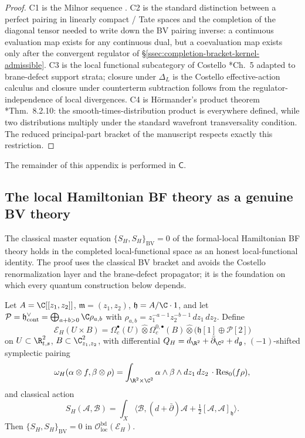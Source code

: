 \begin{proof}
C1 is the Milnor sequence
\cite{milnor-axiomatic-homology}.  C2 is the standard distinction
between a perfect pairing in linearly compact / Tate spaces and the
completion of the diagonal tensor needed to write down the BV pairing
inverse: a continuous evaluation map exists for any continuous dual,
but a coevaluation map exists only after the convergent regulator of
\S\ref{ssec:completion-bracket-kernel-admissible}.  C3 is the local
functional subcategory of Costello \cite{costello-renormalization}*{Ch.~5}
adapted to brane-defect support strata; closure under \(\Delta_L\) is
the Costello effective-action calculus and closure under counterterm
subtraction follows from the regulator-independence of local
divergences.  C4 is H\"ormander's product theorem
\cite{hormander-vol1}*{Thm.~8.2.10}: the smooth-times-distribution
product is everywhere defined, while two distributions multiply under the
standard wavefront transversality condition.  The reduced
principal-part bracket of the manuscript respects exactly this
restriction.
\end{proof}

The remainder of this appendix is performed in \(\mathsf C\).

\subsection{The local Hamiltonian BF theory as a genuine BV theory}
\label{ssec:completion-bv-theorem}

The classical master equation \(\{S_H,S_H\}_{\mathrm{BV}}=0\) of the
formal-local Hamiltonian BF theory holds in the completed
local-functional space as an honest local-functional identity.  The proof
uses the classical BV bracket and avoids the Costello renormalization layer and the
brane-defect propagator; it is the foundation on which every quantum
construction below depends.

\begin{thm}
\label{thm:completion-cme}
Let \(A=\C[[z_1,z_2]]\), \(\mathfrak m=(z_1,z_2)\),
\(\mathfrak h=A/\C\cdot 1\), and let
\(\mathcal P=\mathfrak h^\vee_{\mathrm{cont}}=
\bigoplus_{a+b>0}\C\rho_{a,b}\) with
\(\rho_{a,b}=z_1^{-a-1}z_2^{-b-1}\,dz_1\,dz_2\).  Define
\[
  \mathcal E_H(U\times B)
  =\Omega^\bullet_c(U)\widehat\otimes
   \Omega^{0,\bullet}_c(B)\widehat\otimes
   \bigl(\mathfrak h[1]\oplus\mathcal P[2]\bigr)
\]
on \(U\subset\R^2_{t,s}\), \(B\subset\C^2_{z_1,z_2}\), with
differential \(Q_H=d_{\R^2}+\bar\partial_{\C^2}+d_{\mathfrak g}\),
\((-1)\)-shifted symplectic pairing
\[
  \omega_H(\alpha\otimes f,\beta\otimes\rho)
  =\int_{\R^2\times\C^2}\alpha\wedge\beta\wedge dz_1\,dz_2\,
   \cdot\operatorname{Res}_0(f\rho),
\]
and classical action
\[
  S_H(\mathcal A,\mathcal B)
  =\int_X\bigl\langle\mathcal B,
    (d+\bar\partial)\mathcal A
    +\tfrac12[\mathcal A,\mathcal A]_{\mathfrak h}\bigr\rangle.
\]
Then \(\{S_H,S_H\}_{\mathrm{BV}}=0\) in
\(\mathcal O^{\mathrm{bd}}_{\mathrm{loc}}(\mathcal E_H)\).
\end{thm}

